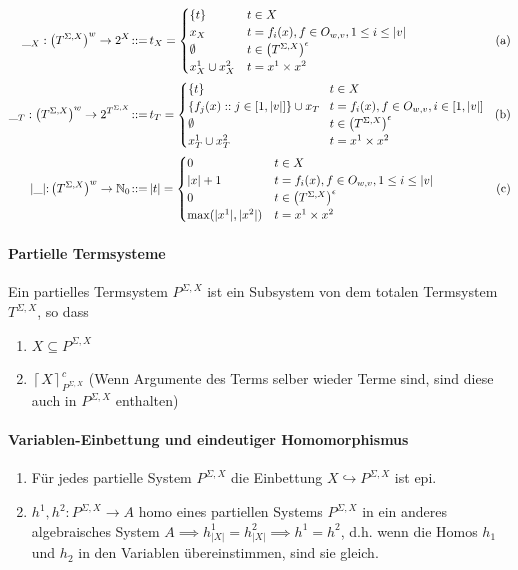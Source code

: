 \begin{align*}
\textrm{\_}_{X}:\left(T^{\Sigma,X}\right)^{w}\rightarrow2^{X}\!::=\, & t_{X}=\begin{cases}
\{t\} & t\in X\\
x_{X} & t=f_{i}(x),f\in O_{w,v},1\leq i\leq|v|\\
\emptyset & t\in\left(T^{\Sigma,X}\right)^{\epsilon}\\
x_{X}^{1}\cup x_{X}^{2} & t=x^{1}\times x^{2}
\end{cases} & \textrm{\!(a)}\\
\textrm{\_}_{T}:\left(T^{\Sigma,X}\right)^{w}\rightarrow2^{T^{\Sigma,X}}\!::=\, & t_{T}=\begin{cases}
\{t\} & \! t\in X\\
\{f_{j}(x)::j\in[1,|v|]\}\cup x_{T} & \! t=f_{i}(x),f\in O_{w,v},i\in[1,|v|]\\
\emptyset & \! t\in\left(T^{\Sigma,X}\right)^{\epsilon}\\
x_{T}^{1}\cup x_{T}^{2} & \! t=x^{1}\times x^{2}
\end{cases} & \textrm{\!(b)}\\
|\textrm{\_|:}\left(T^{\Sigma,X}\right)^{w}\rightarrow\mathbb{N}_{0}\!::=\, & |t|=\begin{cases}
0 & t\in X\\
|x|+1 & t=f_{i}(x),f\in O_{w,v},1\leq i\leq|v|\\
0 & t\in\left(T^{\Sigma,X}\right)^{\epsilon}\\
\max(|x^{1}|,|x^{2}|) & t=x^{1}\times x^{2}
\end{cases} & \textrm{\!(c)}
\end{align*}

\paragraph{ Partielle Termsysteme}  
Ein partielles Termsystem $P^{\Sigma,X}$ ist ein Subsystem von dem totalen Termsystem $T^{\Sigma,X}$, so dass 
\begin{enumerate}
\item $X \subseteq P^{\Sigma,X}$
\item $\left\lceil X\right\rceil _{P^{\Sigma,X}}^{c}$ (Wenn Argumente des Terms selber wieder Terme sind, sind diese auch in $P^{\Sigma,X}$ enthalten)
\end{enumerate}

\paragraph{ Variablen-Einbettung und eindeutiger Homomorphismus}  
\begin{enumerate}
\item Für jedes partielle System $P^{\Sigma,X}$ die Einbettung $X\hookrightarrow P^{\Sigma,X}$ ist epi.
\item $h^1, h^2: P^{\Sigma,X} \rightarrow A$ homo eines partiellen Systems $P^{\Sigma,X}$ in ein anderes algebraisches System $A \implies h_{|X|}^1 = h_{|X|}^2 \implies h^1 = h^2$, d.h. wenn die Homos $h_1$ und $h_2$ in den Variablen übereinstimmen, sind sie gleich.  
\end{enumerate}

